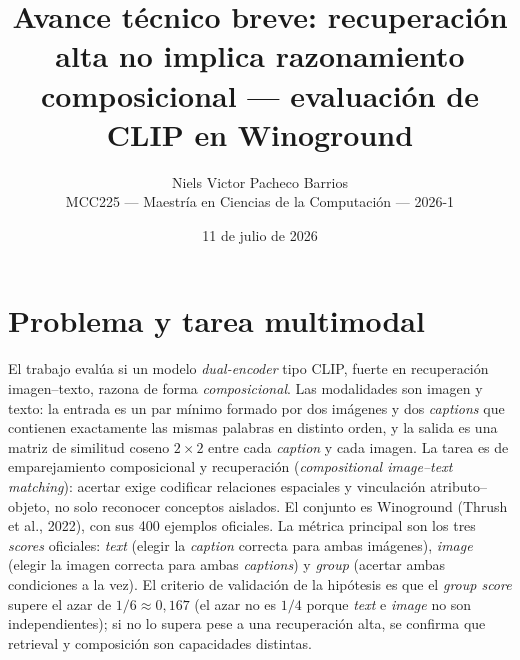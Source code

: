 \documentclass[10pt,a4paper]{article}
\title{\vspace{-1.4cm}\textbf{Avance técnico breve: recuperación alta no implica razonamiento composicional --- evaluación de CLIP en Winoground}}
\author{Niels Victor Pacheco Barrios \\ \small MCC225 --- Maestría en Ciencias de la Computación --- 2026-1}
\date{\vspace{-0.6em}\small 11 de julio de 2026}
\begin{document}
\maketitle
\vspace{-1.2em}

\section{Problema y tarea multimodal}
El trabajo evalúa si un modelo \emph{dual-encoder} tipo CLIP, fuerte en recuperación
imagen--texto, razona de forma \emph{composicional}. Las modalidades son imagen y texto: la
entrada es un par mínimo formado por dos imágenes y dos \emph{captions} que contienen exactamente
las mismas palabras en distinto orden, y la salida es una matriz de similitud coseno
$2\times2$ entre cada \emph{caption} y cada imagen. La tarea es de emparejamiento composicional
y recuperación (\emph{compositional image--text matching}): acertar exige codificar relaciones
espaciales y vinculación atributo--objeto, no solo reconocer conceptos aislados. El conjunto es
Winoground (Thrush et al., 2022), con sus 400 ejemplos oficiales. La métrica principal son los
tres \emph{scores} oficiales: \emph{text} (elegir la \emph{caption} correcta para ambas imágenes),
\emph{image} (elegir la imagen correcta para ambas \emph{captions}) y \emph{group} (acertar ambas
condiciones a la vez). El criterio de validación de la hipótesis es que el \emph{group score}
supere el azar de $1/6 \approx 0{,}167$ (el azar no es $1/4$ porque \emph{text} e \emph{image} no
son independientes); si no lo supera pese a una recuperación alta, se confirma que retrieval y
composición son capacidades distintas.
\end{document}
